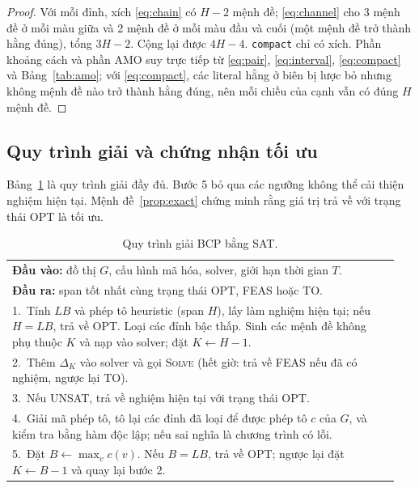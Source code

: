 \begin{proof}
Với mỗi đỉnh, xích \eqref{eq:chain} có $H-2$ mệnh đề; \eqref{eq:channel} cho 3 mệnh đề ở mỗi màu giữa và 2 mệnh đề ở mỗi màu đầu và cuối (một mệnh đề trở thành hằng đúng), tổng $3H-2$. Cộng lại được $4H-4$. \texttt{compact} chỉ có xích. Phần khoảng cách và phần AMO suy trực tiếp từ \eqref{eq:pair}, \eqref{eq:interval}, \eqref{eq:compact} và Bảng~\ref{tab:amo}; với \eqref{eq:compact}, các literal hằng ở biên bị lược bỏ nhưng không mệnh đề nào trở thành hằng đúng, nên mỗi chiều của cạnh vẫn có đúng $H$ mệnh đề.
\end{proof}

\subsection{Quy trình giải và chứng nhận tối ưu}\label{sec:procedure}

Bảng~\ref{tab:procedure} là quy trình giải đầy đủ. Bước 5 bỏ qua các ngưỡng không thể cải thiện nghiệm hiện tại. Mệnh đề~\ref{prop:exact} chứng minh rằng giá trị trả về với trạng thái OPT là tối ưu.

\begin{table}[width=\linewidth,pos=t]
\caption{Quy trình giải BCP bằng SAT.}
\label{tab:procedure}
\centering\small
\begin{tabular}{p{0.95\linewidth}}
\toprule
\textbf{Đầu vào:} đồ thị $G$, cấu hình mã hóa, solver, giới hạn thời gian $T$.\\
\textbf{Đầu ra:} span tốt nhất cùng trạng thái OPT, FEAS hoặc TO.\\
\midrule
1.\ Tính $LB$ và phép tô heuristic (span $H$), lấy làm nghiệm hiện tại; nếu $H=LB$, trả về OPT. Loại các đỉnh bậc thấp. Sinh các mệnh đề không phụ thuộc $K$ và nạp vào solver; đặt $K\leftarrow H-1$.\\
2.\ Thêm $\Delta_K$ vào solver và gọi \textsc{Solve} (hết giờ: trả về FEAS nếu đã có nghiệm, ngược lại TO).\\
3.\ Nếu UNSAT, trả về nghiệm hiện tại với trạng thái OPT.\\
4.\ Giải mã phép tô, tô lại các đỉnh đã loại để được phép tô $c$ của $G$, và kiểm tra bằng hàm độc lập; nếu sai nghĩa là chương trình có lỗi.\\
5.\ Đặt $B\leftarrow\max_v c(v)$. Nếu $B=LB$, trả về OPT; ngược lại đặt $K\leftarrow B-1$ và quay lại bước 2.\\
\bottomrule
\end{tabular}
\end{table}
